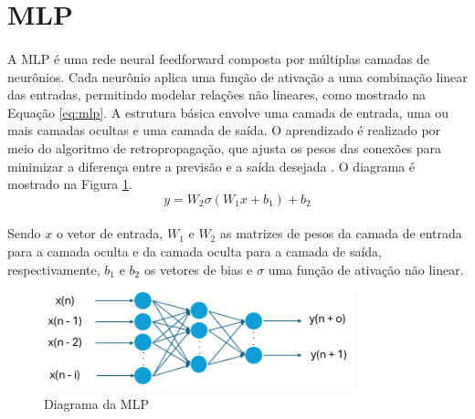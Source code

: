 \section{\acf{MLP}}

\paragraph{} A \ac{MLP} é uma rede neural feedforward composta por múltiplas camadas de neurônios. Cada neurônio aplica uma função de ativação a uma combinação linear das entradas, permitindo modelar relações não lineares, como mostrado na Equação \ref{eq:mlp}. A estrutura básica envolve uma camada de entrada, uma ou mais camadas ocultas e uma camada de saída. O aprendizado é realizado por meio do algoritmo de retropropagação, que ajusta os pesos das conexões para minimizar a diferença entre a previsão e a saída desejada \cite{haykin1998neural}. O diagrama é mostrado na Figura \ref{fig:mlp_diagram}.
\begin{equation}
	y = W_{2} \sigma(W_{1} x + b_{1}) + b_{2}
	\label{eq:mlp}
\end{equation}
\paragraph{} Sendo \( x \) o vetor de entrada, \( W_1 \) e \( W_2 \) as matrizes de pesos da camada de entrada para a camada oculta e da camada oculta para a camada de saída, respectivamente, \( b_1 \) e \( b_2 \) os vetores de bias e \( \sigma \) uma função de ativação não linear.

\begin{figure}
	\begin{center}
		\begin{center}
			\includegraphics[width=0.8\textwidth]{figuras/mlp_diagram.png}
			\caption{Diagrama da \acs{MLP}}
			\label{fig:mlp_diagram}
		\end{center}

	\end{center}
\end{figure}

